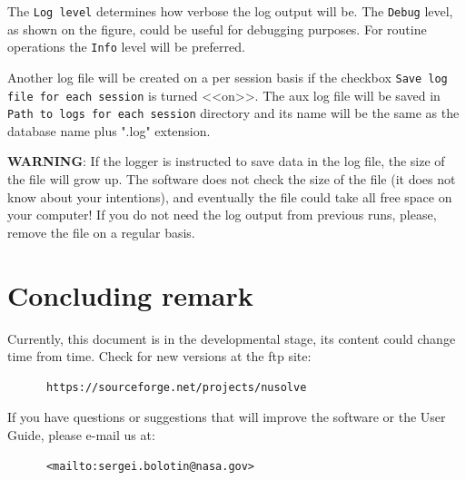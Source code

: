 \documentclass [10pt,letterpaper]{report}
\begin{document}
The {\tt Log level} determines how verbose the log output will be. The {\tt Debug}
level, as shown on the figure, could be useful for debugging purposes. For
routine operations the {\tt Info} level will be preferred.


Another log file will be created on a per session basis if the checkbox
{\tt Save log file for each session} is turned <<on>>. The aux log file
will be saved in {\tt Path to logs for each session} directory and its
name will be the same as the database name plus ".log" extension.

{\bf \color{red}WARNING}: If the logger is instructed to save data in
the log file, the size of the file will grow up. The software does not
check the size of the file (it does not know about your intentions), and
eventually the file could take all free space on your computer! If you
do not need the log output from previous runs, please, remove the file on
a regular basis.



%
%
\chapter{Concluding remark}
\label{chapt_concluding_remark}
Currently, this document is in the developmental stage, its content could change
time from time. Check for new versions at the ftp site:

\begin{verbatim}
      https://sourceforge.net/projects/nusolve
\end{verbatim}

\noindent
If you have questions or suggestions that will improve the software or
the User Guide, please e-mail us at:

\begin{verbatim}
      <mailto:sergei.bolotin@nasa.gov>
\end{verbatim}

\end{document}
